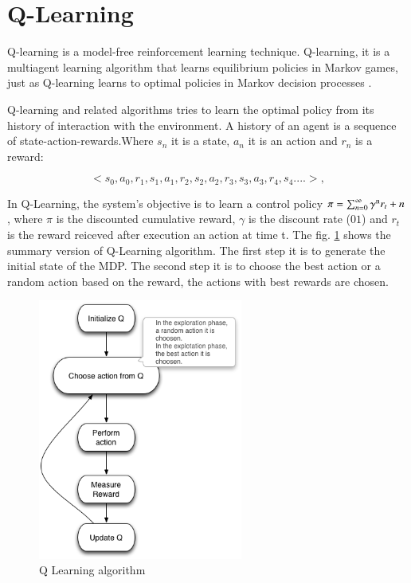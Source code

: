 \section{Q-Learning}

Q-learning is a model-free reinforcement learning technique. Q-learning, it is a multiagent learning algorithm that learns equilibrium policies in Markov games, just as Q-learning learns to optimal policies in Markov decision processes \cite{Greenwald2003}. 

Q-learning and related algorithms tries to learn the optimal policy from its history of interaction with the environment. A history of an agent is a sequence of state-action-rewards.Where $s_{n}$ it is a state, $a_{n}$ it is an action and $r_{n}$ is a reward:

\begin{equation}
<s_{0},a_{0},r_{1},s_{1},a_{1},r_{2},s_{2},a_{2},r_{3},s_{3},a_{3},r_{4},s_{4}....>,
\end{equation}


In Q-Learning, the system's objective is to learn a control policy $\pi = \sum_{n=0}^{\infty} \gamma\textsuperscript{n}  r_{t}+n $, where $\pi$  is the discounted cumulative reward, $\gamma$ is the discount rate ($01$) and $r_{t}$ is the reward reiceved after execution an action at time t. The fig. \ref{fig:qalgo} shows the summary version of Q-Learning algorithm. The first step it is to generate the initial state of the MDP. The second step it is to choose the best action or a random action based on the reward, the actions with best rewards are chosen.


\begin{figure}[h!]
\centering
\includegraphics[width=0.6\textwidth]{./images/qalgo.png}
\caption{Q Learning algorithm}
\label{fig:qalgo}
\end{figure}


